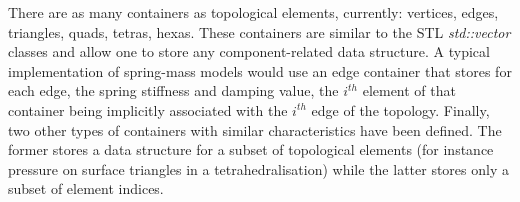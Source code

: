 There are as many containers as topological elements, currently: vertices, edges, triangles, quads, tetras, hexas. These containers are similar to the STL \textit{ std::vector} classes and allow one to store any component-related data structure. A typical implementation of spring-mass models would use an edge container that stores for each edge, the spring stiffness and damping value, the $i^{th}$ element of that container being implicitly associated with the $i^{th}$ edge of the topology. Finally, two other types of containers with similar characteristics have been defined. The former stores a data structure for a subset of topological elements (for instance pressure on surface triangles in a tetrahedralisation) while the latter stores only a subset of element indices.\\






